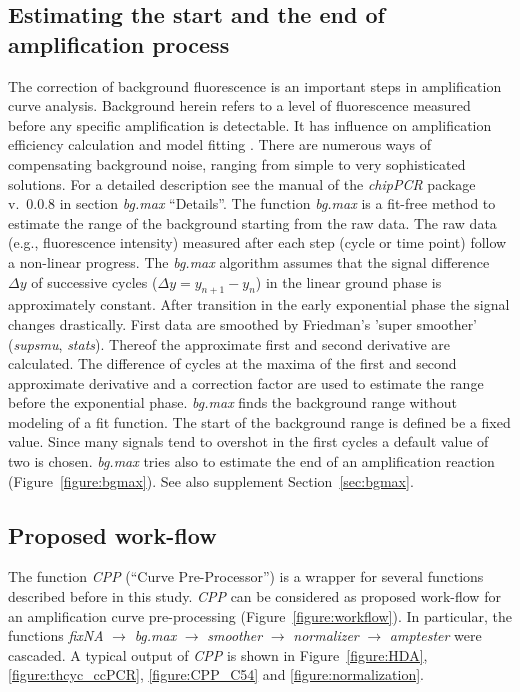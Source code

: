 \documentclass[twocolumn]{bmcart}%
\begin{document}
\subsection*{Estimating the start and the end of amplification process}

  The correction of background fluorescence is an important steps in 
amplification curve analysis. Background herein refers to a level of 
fluorescence measured before any specific amplification is detectable. It has 
influence on amplification efficiency calculation and model fitting 
\cite{tuomi_2010, rutledge_2008, ruijter_2009}. There are numerous ways of 
compensating background noise, ranging from simple to very sophisticated 
solutions. For a detailed description see the manual of the \textsl{chipPCR} 
package v.~0.0.8 in section \textsl{bg.max} ``Details''. The function 
\textsl{bg.max} is a fit-free method to estimate the range of the background 
starting from the raw data. The raw data (e.g., fluorescence intensity) measured 
after each step (cycle or time point) follow a non-linear progress. The 
\textsl{bg.max} algorithm assumes that the signal difference $\Delta{y}$ of 
successive cycles ($\Delta{y} = y_{n + 1} - y_n$) in the linear ground phase is 
approximately constant. After transition in the early exponential phase the 
signal changes drastically. First data are smoothed by Friedman’s ’super 
smoother’ (\textsl{supsmu}, \emph{stats}). Thereof the approximate first and 
second derivative are calculated. The difference of cycles at the maxima of the 
first and second approximate derivative and a correction factor are used to 
estimate the range before the exponential phase. \textsl{bg.max} finds the 
background range without modeling of a fit function. The start of the background 
range is defined be a fixed value. Since many signals tend to overshot in the 
first cycles a default value of two is chosen. \textsl{bg.max} tries also to 
estimate the end of an amplification reaction (Figure~\ref{figure:bgmax}). See 
also supplement Section~\ref{sec:bgmax}.

\subsection*{Proposed work-flow}

The function \textsl{CPP} (``Curve Pre-Processor'') is a wrapper for several 
functions described before in this study. \textsl{CPP} can be considered as 
proposed work-flow for an amplification curve pre-processing 
(Figure~\ref{figure:workflow}). In particular, the functions \textsl{fixNA} 
$\rightarrow$ \textsl{bg.max} $\rightarrow$ \textsl{smoother} $\rightarrow$ 
\textsl{normalizer} $\rightarrow$ \textsl{amptester} were cascaded. A typical 
output of \textsl{CPP} is shown in Figure~\ref{figure:HDA}, 
\ref{figure:thcyc_ccPCR}, \ref{figure:CPP_C54} and \ref{figure:normalization}.
\end{document}

